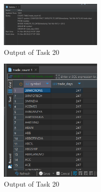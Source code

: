 \documentclass{article}
\begin{document}
\begin{figure}[H]
	\centering
	\includegraphics[width=0.45\textwidth]{Images/Task20-1.png}
	\caption{Output of Task 20}
\end{figure}

\begin{figure}[H]
	\centering
	\includegraphics[width=0.45\textwidth]{Images/Task20-2.png}
	\caption{Output of Task 20}
\end{figure}
\end{document}
